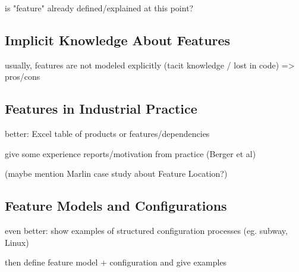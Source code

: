 is "feature" already defined/explained at this point?

\subsection{Implicit Knowledge About Features}

usually, features are not modeled explicitly (tacit knowledge / lost in code) => pros/cons

\subsection{Features in Industrial Practice}

better: Excel table of products or features/dependencies

give some experience reports/motivation from practice (Berger et al)

(maybe mention Marlin case study about Feature Location?)

\subsection{Feature Models and Configurations}

even better: show examples of structured configuration processes (eg. subway, Linux)

then define feature model + configuration and give examples
